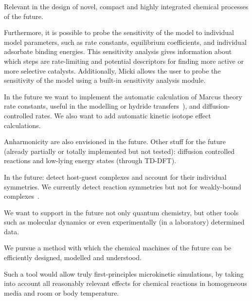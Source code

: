 Relevant in the design of novel, compact and highly integrated chemical processes of the future.


Furthermore, it is possible to probe the sensitivity of the model to individual model parameters, such as rate constants, equilibrium coefficients, and individual adsorbate binding energies. This sensitivity analysis gives information about which steps are rate-limiting and potential descriptors for finding more active or more selective catalysts.
Additionally, Micki allows the user to probe the sensitivity of the model using a built-in sensitivity analysis module.

In the future we want to implement the automatic calculation of Marcus theory rate constants, useful in the modelling or hydride transfers~\cite{Nikbin_2012}), and diffusion-controlled rates.
We also want to add automatic kinetic isotope effect calculations.


Anharmonicity are also envisioned in the future.
Other stuff for the future (already partially or totally implemented but not tested): diffusion controlled reactions and low-lying energy states (through TD-DFT).

In the future: detect host-guest complexes and account for their individual symmetries.
We currently detect reaction symmetries but not for weakly-bound complexes~\cite{Gilson_2010}.

We want to support in the future not only quantum chemistry, but other tools such as molecular dynamics or even experimentally (in a laboratory) determined data.

We pursue a method with which the chemical machines of the future can be efficiently designed, modelled and understood.

Such a tool would allow truly first-principles microkinetic simulations, by taking into account all reasonably relevant effects for chemical reactions in homogeneous media and room or body temperature.
